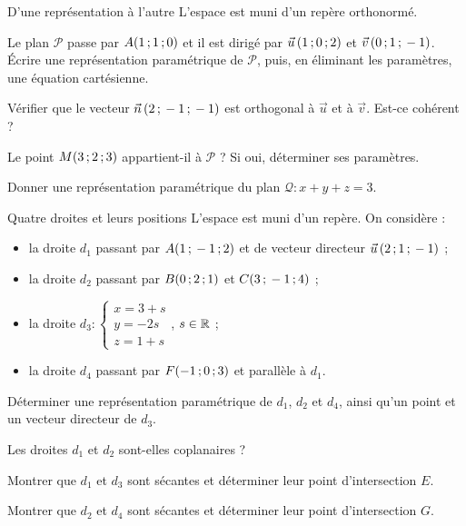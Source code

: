 \begin{exercice}[2]{D'une représentation à l'autre}
L'espace est muni d'un repère orthonormé.
\begin{questions}
  \item Le plan $\mathcal{P}$ passe par $A(1\,{;}\,1\,{;}\,0)$ et il est dirigé par $\vec u\,(1\,{;}\,0\,{;}\,2)$ et $\vec v\,(0\,{;}\,1\,{;}\,-1)$. Écrire une
    représentation paramétrique de $\mathcal{P}$, puis, en éliminant les paramètres, une équation cartésienne.
  \item Vérifier que le vecteur $\vec n\,(2\,{;}\,-1\,{;}\,-1)$ est orthogonal à $\vec u$ et à $\vec v$. Est-ce cohérent ?
  \item Le point $M(3\,{;}\,2\,{;}\,3)$ appartient-il à $\mathcal{P}$ ? Si oui, déterminer ses paramètres.
  \item Donner une représentation paramétrique du plan $\mathcal{Q}:x+y+z=3$.
\end{questions}
\end{exercice}

\begin{exercice}[2]{Quatre droites et leurs positions}
L'espace est muni d'un repère. On considère :
\begin{itemize}[leftmargin=1.4em,itemsep=0.3mm,topsep=0.5mm]
  \item la droite $d_1$ passant par $A(1\,{;}\,-1\,{;}\,2)$ et de vecteur directeur $\vec u\,(2\,{;}\,1\,{;}\,-1)$ ;
  \item la droite $d_2$ passant par $B(0\,{;}\,2\,{;}\,1)$ et $C(3\,{;}\,-1\,{;}\,4)$ ;
  \item la droite $d_3:\begin{cases}x=3+s\\y=-2s\\z=1+s\end{cases}$, $s\in\mathbb{R}$ ;
  \item la droite $d_4$ passant par $F(-1\,{;}\,0\,{;}\,3)$ et parallèle à $d_1$.
\end{itemize}
\begin{questions}
  \item Déterminer une représentation paramétrique de $d_1$, $d_2$ et $d_4$, ainsi qu'un point et un vecteur directeur de $d_3$.
  \item Les droites $d_1$ et $d_2$ sont-elles coplanaires ?
  \item Montrer que $d_1$ et $d_3$ sont sécantes et déterminer leur point d'intersection $E$.
  \item Montrer que $d_2$ et $d_4$ sont sécantes et déterminer leur point d'intersection $G$.
\end{questions}
\end{exercice}

